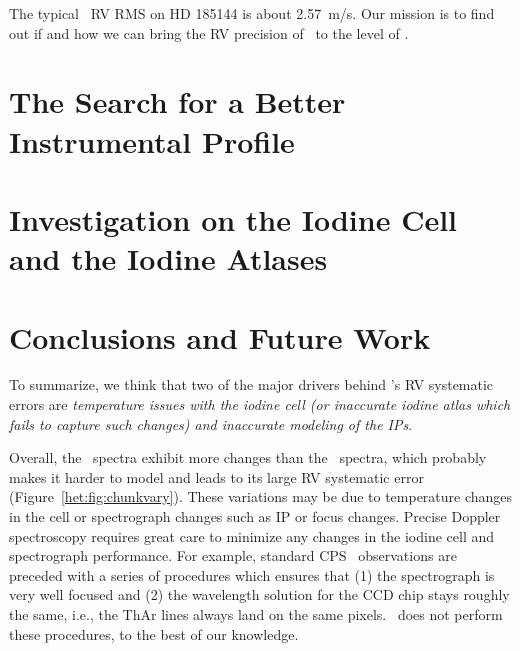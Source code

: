 The typical \keck\ RV RMS on HD 185144 is about 2.57~m/s. Our mission
is to find out if and how we can bring the RV precision of \het\ to
the level of \keck.


\section{The Search for a Better Instrumental
  Profile}\label{het:sec:ip} 




\section{Investigation on the Iodine Cell and the Iodine
  Atlases}\label{het:sec:fts} 




 

 
\section{Conclusions and Future Work}\label{het:sec:conclusion}
 
To summarize, we think that two of the major drivers behind \het's RV
systematic errors are {\em temperature issues with the iodine
cell (or inaccurate iodine atlas which fails to capture such changes)
and inaccurate modeling of the IPs}. 

Overall, the \het\ spectra exhibit more changes than the \keck\
spectra, which probably makes it harder to model and leads to its
large RV systematic error (Figure~\ref{het:fig:chunkvary}). These
variations may be due to temperature changes in the cell or
spectrograph changes such as IP or focus changes. Precise Doppler
spectroscopy requires great care to minimize any changes in the iodine
cell and spectrograph performance. For example, standard CPS \keck\
observations are preceded with a series of procedures which ensures
that (1) the spectrograph is very well focused and (2) the wavelength
solution for the CCD chip stays roughly the same, i.e., the ThAr lines
always land on the same pixels. \het\ does not perform these
procedures, to the best of our knowledge.

